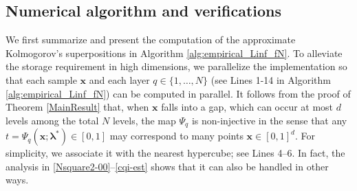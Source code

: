 \documentclass[10pt,reqno,final]{amsart}
\theoremstyle{remark}
\theoremstyle{definition}
\newcommand{\bs}[1]{\boldsymbol{#1}}
\begin{document}
\subsection{Numerical algorithm and verifications} 
We first summarize and present the computation of the approximate Kolmogorov's superpositions in 
Algorithm \ref{alg:empirical_Linf_fN}. To alleviate 
the storage requirement in high dimensions, we parallelize the implementation so that each sample $\bs x$ and each layer $q\in \{1,\ldots, N\}$ (see Lines 1-14 in 
Algorithm \ref{alg:empirical_Linf_fN}) can be computed in parallel.   It follows from the proof of Theorem \ref{MainResult} that, when $\bs x$ falls into a gap,
which can occur at most $d$ levels among the total $N$ levels, the map
$\Psi_q$ is non-injective in the sense that any $t=\Psi_q(\bs x;\bs \lambda^*)\in [0,1]$ may
correspond to many points $\bs x\in [0,1]^d.$ For simplicity, we associate it with the nearest hypercube; see Lines 4–6. In fact, the analysis in \eqref{Nsquare2-00}–\eqref{cqi-est} shows that it can also be handled in other ways.  
\end{document}
